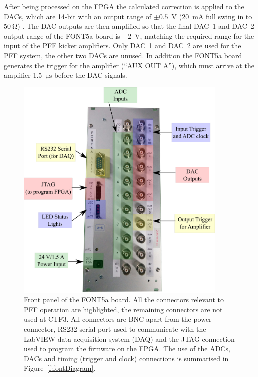 After being processed on the FPGA the calculated correction is applied to the DACs, which are 14-bit with an output range of \(\pm0.5\)~V (20~mA full swing in to \(50~\mathrm{\Omega}\)) \cite{fontDACs}. The DAC outputs are then amplified so that the final DAC~1 and DAC~2 output range of the FONT5a board is \(\pm 2\)~V,  matching the required range for the input of the PFF kicker amplifiers. Only DAC~1 and DAC~2 are used for the PFF system, the other two DACs are unused. In addition the FONT5a board generates the trigger for the amplifier (``AUX OUT A''), which must arrive at the amplifier 1.5~\(\mathrm{\mu s}\) before the DAC signals.

\begin{figure}
  \centering
  \includegraphics[width=0.9\textwidth]{Figures/commissioning/FONT5aPanelPic}
  \caption{Front panel of the FONT5a board. All the connectors relevant to PFF operation are highlighted, the remaining connectors are not used at CTF3. All connectors are BNC apart from the power connector, RS232 serial port used to communicate with the LabVIEW data acquisition system (DAQ) and the JTAG connection used to program the firmware on the FPGA. The use of the ADCs, DACs and timing (trigger and clock) connections is summarised in Figure~\ref{f:fontDiagram}. }
  \label{f:FONT5aPanelPic}
\end{figure}

